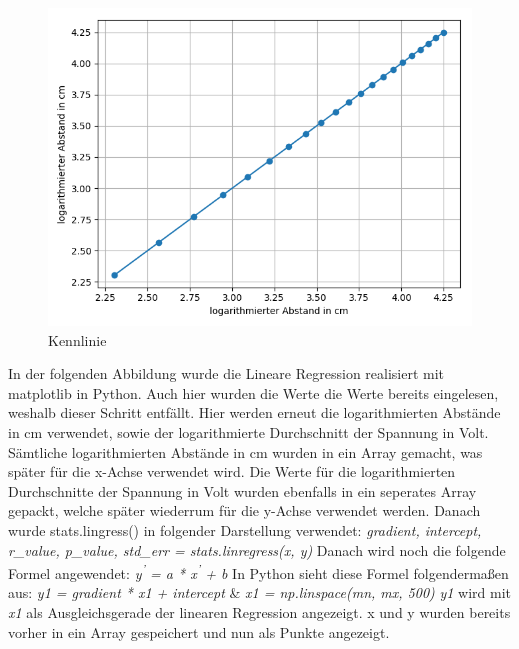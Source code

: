 \documentclass[12pt, oneside, a4paper, \docLanguage]{report}
\begin{document}
\begin{figure}[hbt!]
	\centering\small
	\includegraphics[width=\textwidth]{media/myplot5.png}
	\caption{Kennlinie}
	\label{fig:Kennlinie}
\end{figure}
\newpage
In der folgenden Abbildung wurde die Lineare Regression realisiert mit matplotlib in Python.
Auch hier wurden die Werte die Werte bereits eingelesen, weshalb dieser Schritt entfällt.
\newline
Hier werden erneut die logarithmierten Abstände in cm verwendet, sowie der logarithmierte Durchschnitt der Spannung in Volt. 
Sämtliche logarithmierten Abstände in cm wurden in ein Array gemacht, was später für die x-Achse verwendet wird.
Die Werte für die logarithmierten Durchschnitte der Spannung in Volt wurden ebenfalls in ein seperates Array gepackt, welche später wiederrum für die y-Achse verwendet werden.
\newline
\newline
Danach wurde stats.lingress() in folgender Darstellung verwendet:
\newline
\textit{gradient, intercept, r\_value, p\_value, std\_err = stats.linregress(x, y)}
\newline
Danach wird noch die folgende Formel angewendet: 
\textit{y\textsuperscript{'} = a *  x\textsuperscript{'} + b}
\newline
In Python sieht diese Formel folgendermaßen aus: \textit{y1 = gradient * x1 + intercept} \& \textit{x1 = np.linspace(mn, mx, 500)}
\textit{y1} wird mit \textit{x1} als Ausgleichsgerade der linearen Regression angezeigt.
x und y wurden bereits vorher in ein Array gespeichert und nun als Punkte angezeigt.
\end{document}
